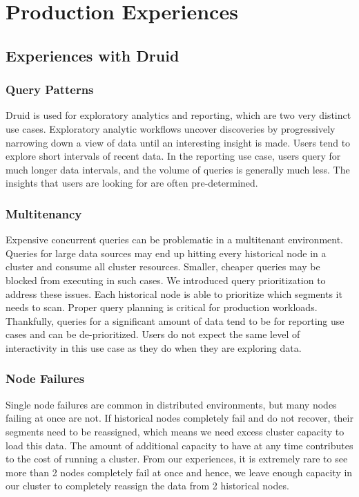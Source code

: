 \documentclass{vldb}
\begin{document}
\section{Production Experiences}
\label{sec:experiences}

\subsection{Experiences with Druid}
\subsubsection{Query Patterns}
Druid is used for exploratory analytics and reporting, which are two very
distinct use cases. Exploratory analytic workflows uncover discoveries by
progressively narrowing down a view of data until an interesting insight is
made. Users tend to explore short intervals of recent data. In the reporting
use case, users query for much longer data intervals, and the volume of queries
is generally much less. The insights that users are looking for are often
pre-determined. 

\subsubsection{Multitenancy}
Expensive concurrent queries can be problematic in a multitenant environment.
Queries for large data sources may end up hitting every historical node in a
cluster and consume all cluster resources. Smaller, cheaper queries may be
blocked from executing in such cases. We introduced query prioritization to
address these issues. Each historical node is able to prioritize which segments
it needs to scan. Proper query planning is critical for production workloads.
Thankfully, queries for a significant amount of data tend to be for reporting
use cases and can be de-prioritized. Users do not expect the same level of
interactivity in this use case as they do when they are exploring data. 

\subsubsection{Node Failures}
Single node failures are common in distributed environments, but many nodes
failing at once are not. If historical nodes completely fail and do not
recover, their segments need to be reassigned, which means we need excess
cluster capacity to load this data. The amount of additional capacity to have
at any time contributes to the cost of running a cluster. From our experiences,
it is extremely rare to see more than 2 nodes completely fail at once and
hence, we leave enough capacity in our cluster to completely reassign the data
from 2 historical nodes. 
\end{document}
